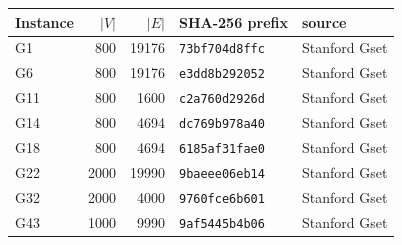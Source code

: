 \begin{tabular}{lrrll}
\toprule
Instance & $|V|$ & $|E|$ & SHA-256 prefix & source\\
\midrule
G1 & 800 & 19176 & \texttt{73bf704d8ffc} & Stanford Gset\\
G6 & 800 & 19176 & \texttt{e3dd8b292052} & Stanford Gset\\
G11 & 800 & 1600 & \texttt{c2a760d2926d} & Stanford Gset\\
G14 & 800 & 4694 & \texttt{dc769b978a40} & Stanford Gset\\
G18 & 800 & 4694 & \texttt{6185af31fae0} & Stanford Gset\\
G22 & 2000 & 19990 & \texttt{9baeee06eb14} & Stanford Gset\\
G32 & 2000 & 4000 & \texttt{9760fce6b601} & Stanford Gset\\
G43 & 1000 & 9990 & \texttt{9af5445b4b06} & Stanford Gset\\
\bottomrule
\end{tabular}
